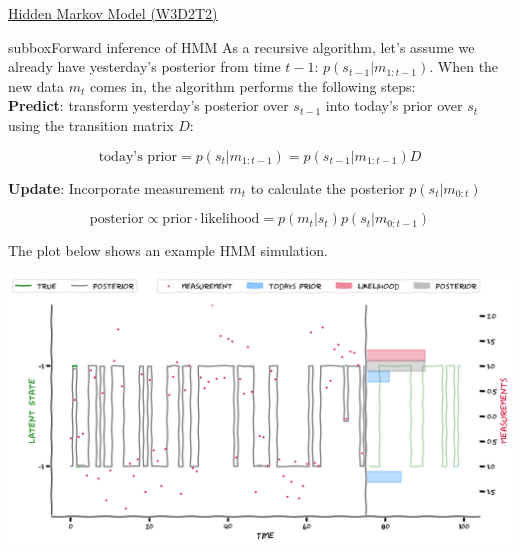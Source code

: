 \begin{textbox}{\href{http://instructor.compneuro.neuromatch.io/tutorials/W3D2_HiddenDynamics/instructor/W3D2_Tutorial2.html}{Hidden Markov Model (W3D2T2)}   }

\begin{subbox}{subbox}{Forward inference of HMM}
\scriptsize
As a recursive algorithm, let's assume we already have yesterday's posterior from time $t-1$: $p(s_{t-1}|m_{1:t-1})$. When the new data $m_{t}$ comes in, the algorithm performs the following steps:\\

\textbf{Predict}: transform yesterday's posterior over $s_{t-1}$ into today's prior over $s_t$ using the transition matrix $D$:

\begin{equation*}
\text{today's prior}=p(s_t|m_{1:t-1})= p(s_{t-1}|m_{1:t-1}) D
\end{equation*}

\textbf{Update}: Incorporate measurement $m_t$ to calculate the posterior $p(s_t|m_{0:t})$

\begin{equation*}
\text{posterior} \propto \text{prior}\cdot \text{likelihood}=p(m_t|s_t)p(s_t|m_{0:t-1})
\end{equation*}


The plot below shows an example HMM simulation. 
\begin{center}
    
\includegraphics[scale=0.25]{Figures/HD/HD_Figure5.png}
\end{center}
\end{subbox}




\end{textbox}
\newpage
